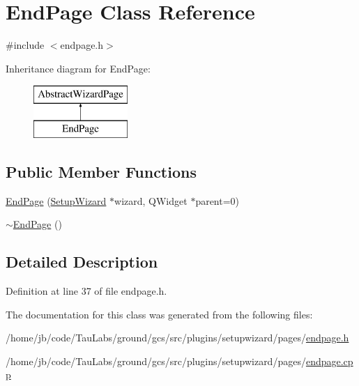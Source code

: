 \hypertarget{class_end_page}{\section{\-End\-Page \-Class \-Reference}
\label{class_end_page}
}


{\ttfamily \#include $<$endpage.\-h$>$}

\-Inheritance diagram for \-End\-Page\-:\begin{figure}[H]
\begin{center}
\leavevmode
\includegraphics[height=2.000000cm]{class_end_page}
\end{center}
\end{figure}
\subsection*{\-Public \-Member \-Functions}
\begin{DoxyCompactItemize}
\item 
\hyperlink{group___setup_gaa49419069a19a1a8848036fd03dbf053}{\-End\-Page} (\hyperlink{class_setup_wizard}{\-Setup\-Wizard} $\ast$wizard, \-Q\-Widget $\ast$parent=0)
\item 
\hyperlink{group___setup_ga7fa99955774788be173afc53b98dcc0b}{$\sim$\-End\-Page} ()
\end{DoxyCompactItemize}


\subsection{\-Detailed \-Description}


\-Definition at line 37 of file endpage.\-h.



\-The documentation for this class was generated from the following files\-:\begin{DoxyCompactItemize}
\item 
/home/jb/code/\-Tau\-Labs/ground/gcs/src/plugins/setupwizard/pages/\hyperlink{endpage_8h}{endpage.\-h}\item 
/home/jb/code/\-Tau\-Labs/ground/gcs/src/plugins/setupwizard/pages/\hyperlink{endpage_8cpp}{endpage.\-cpp}\end{DoxyCompactItemize}
